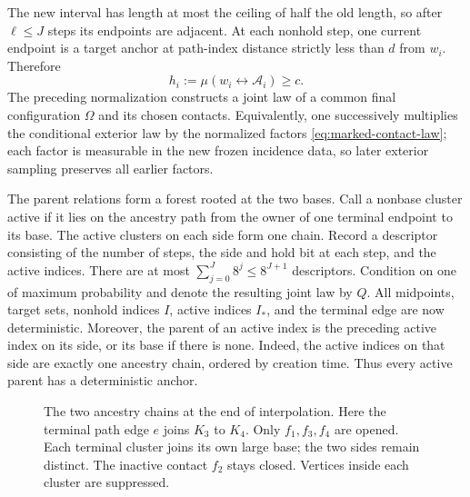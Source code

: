\documentclass[11pt]{article}
\theoremstyle{definition}
\begin{document}
The new interval has length at most the ceiling of half the old length,
so after $\ell\le J$ steps its endpoints are adjacent. At each
nonhold step, one current endpoint is a target anchor at path-index
distance strictly less than $d$ from $w_i$. Therefore
\begin{equation}\label{eq:interpolation-root-bound}
 h_i:=\mu(w_i\leftrightarrow\mathcal A_i)\ge c.
\end{equation}
The preceding normalization constructs a joint law of a common final
configuration $\Omega$ and its chosen contacts. Equivalently, one
successively multiplies the conditional exterior law by the normalized
factors \eqref{eq:marked-contact-law}; each factor is measurable in the
new frozen incidence data, so later exterior sampling preserves all
earlier factors.

The parent relations form a forest rooted at the two bases. Call a
nonbase cluster active if it lies on the ancestry path from the owner
of one terminal endpoint to its base. The active clusters on each side
form one chain. Record a descriptor consisting of the number of steps,
the side and hold bit at each step, and the active indices. There are
at most $\sum_{j=0}^J8^j\le8^{J+1}$ descriptors. Condition on one of
maximum probability and denote the resulting joint law by $Q$.
All midpoints, target sets, nonhold indices $I$, active indices $I_*$,
and the terminal edge are now deterministic. Moreover, the parent of
an active index is the preceding active index on its side, or its base
if there is none. Indeed, the active indices on that side are exactly
one ancestry chain, ordered by creation time. Thus every active parent
has a deterministic anchor.

\begin{figure}[tbp]
\centering
{}
\caption{The two ancestry chains at the end of interpolation.
Here the terminal path edge $e$ joins $K_3$ to $K_4$.
Only $f_1,f_3,f_4$ are opened. Each terminal cluster joins its own
large base; the two sides remain distinct. The inactive contact
$f_2$ stays closed. Vertices inside each cluster are suppressed.}
\label{fig:interpolation}
\end{figure}
\end{document}
